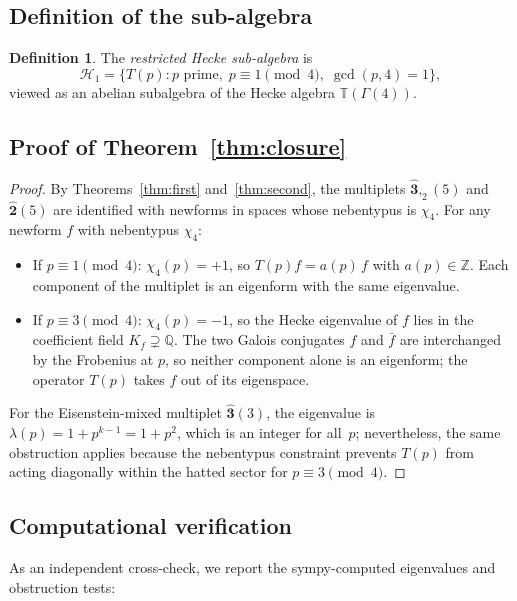 \documentclass[12pt]{amsart}
\theoremstyle{definition}
\newtheorem{definition}[theorem]{Definition}
\newcommand{\Z}{\mathbb{Z}}
\newcommand{\Q}{\mathbb{Q}}
\newcommand{\Gam}{\Gamma}
\newcommand{\hhat}[1]{\widehat{\mathbf{#1}}}  %
\newcommand{\HH}{\mathcal{H}_1}      %
\begin{document}
\subsection{Definition of the sub-algebra}

\begin{definition}
  The \emph{restricted Hecke sub-algebra} is
  \[
    \HH = \{T(p) : p \text{ prime},\; p\equiv 1\pmod{4},\;
            \gcd(p,4)=1\},
  \]
  viewed as an abelian subalgebra of the Hecke algebra
  $\mathbb{T}(\Gam(4))$.
\end{definition}

\subsection{Proof of Theorem~\ref{thm:closure}}

\begin{proof}
  By Theorems~\ref{thm:first} and~\ref{thm:second}, the multiplets
  $\hhat{3},_2(5)$ and $\hhat{2}(5)$ are identified with newforms
  in spaces whose nebentypus is $\chi_4$.
  For any newform $f$ with nebentypus $\chi_4$:
  \begin{itemize}
    \item If $p\equiv 1\pmod{4}$: $\chi_4(p) = +1$, so
      $T(p)f = a(p)\,f$ with $a(p)\in\Z$.
      Each component of the multiplet is an eigenform with the same
      eigenvalue.
    \item If $p\equiv 3\pmod{4}$: $\chi_4(p) = -1$, so
      the Hecke eigenvalue of $f$ lies in the coefficient field
      $K_f \supsetneq \Q$.  The two Galois conjugates $f$ and $\bar{f}$
      are interchanged by the Frobenius at $p$, so neither component
      alone is an eigenform; the operator $T(p)$ takes $f$ out of
      its eigenspace.
  \end{itemize}
  For the Eisenstein-mixed multiplet $\hhat{3}(3)$, the eigenvalue
  is $\lambda(p) = 1 + p^{k-1} = 1 + p^2$, which is an integer for
  all~$p$; nevertheless, the same obstruction applies because the
  nebentypus constraint prevents $T(p)$ from acting diagonally
  within the hatted sector for $p\equiv 3\pmod{4}$.
\end{proof}

\subsection{Computational verification}

As an independent cross-check, we report the sympy-computed
eigenvalues and obstruction tests:
\end{document}
